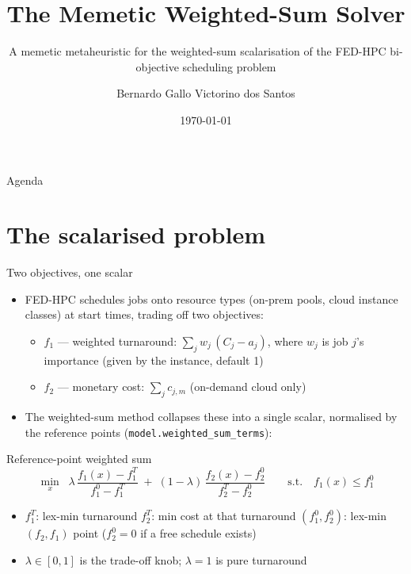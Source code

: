 \documentclass[aspectratio=169,t]{beamer}
\title{The Memetic Weighted-Sum Solver}
\subtitle{A memetic metaheuristic for the weighted-sum scalarisation of the FED-HPC bi-objective scheduling problem}
\author{Bernardo Gallo Victorino dos Santos}
\institute{FED-HPC --- Multi-objective scheduling for federated HPC platforms}
\date{\today}
\newcommand{\code}[1]{\texttt{#1}}
\begin{document}
\maketitle

\begin{frame}{Agenda}
  \tableofcontents
\end{frame}

\section{The scalarised problem}

\begin{frame}{Two objectives, one scalar}
  \begin{itemize}
    \item FED-HPC schedules jobs onto resource \alert{types} (on-prem pools, cloud
      instance classes) at \alert{start times}, trading off two objectives:
    \begin{itemize}
      \item $f_1$ --- weighted turnaround: $\sum_j w_j\,(C_j - a_j)$, where
        $w_j$ is job $j$'s importance (given by the instance, default 1)
      \item $f_2$ --- monetary cost: $\sum_j c_{j,m}$ (on-demand cloud only)
    \end{itemize}
    \item The weighted-sum method collapses these into a single scalar,
      normalised by the reference points (\code{model.weighted\_sum\_terms}):
  \end{itemize}
  \begin{block}{Reference-point weighted sum}
    \[
      \min_x \;\; \lambda\,\frac{f_1(x) - f_1^{T}}{f_1^{0} - f_1^{T}}
                \;+\; (1-\lambda)\,\frac{f_2(x) - f_2^{0}}{f_2^{T} - f_2^{0}}
      \qquad \text{s.t.} \quad f_1(x) \le f_1^{0}
    \]
  \end{block}
  \begin{itemize}
    \item $f_1^{T}$: lex-min turnaround \quad $f_2^{T}$: min cost at that
          turnaround \quad $(f_1^{0}, f_2^{0})$: lex-min $(f_2, f_1)$ point
          ($f_2^{0}{=}0$ if a free schedule exists)
    \item $\lambda \in [0,1]$ is the trade-off knob; $\lambda{=}1$ is pure turnaround
  \end{itemize}
\end{frame}
\end{document}
